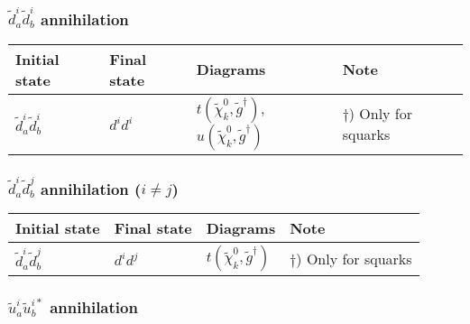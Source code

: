 \subsubsection{$\tilde{d}^i_{a}\tilde{d}_{b}^{i}$ annihilation}

\begin{center}
\begin{tabular}{llll} \hline
{\bfseries Initial state} & {\bfseries Final state} &
{\bfseries Diagrams} & {\bfseries Note} \\ \hline \tabspace
$\tilde{d}^i_a\tilde{d}^{i}_b$ & $d^i d^i$ &
$t(\tilde{\chi}_{k}^0,\tilde{g}^\dagger)$, $u(\tilde{\chi}_{k}^0,\tilde{g}^\dagger)$ 
& $\dagger$) Only for squarks \\ \hline
\end{tabular}
\end{center}

\subsubsection{$\tilde{d}^i_{a}\tilde{d}_{b}^{j}$ annihilation ($i \ne j$)}

\begin{center}
\begin{tabular}{llll} \hline
{\bfseries Initial state} & {\bfseries Final state} &
{\bfseries Diagrams} & {\bfseries Note} \\ \hline \tabspace
$\tilde{d}^i_a\tilde{d}^{j}_b$ & $d^i d^j$ &
$t(\tilde{\chi}_{k}^0,\tilde{g}^\dagger)$
& $\dagger$) Only for squarks \\ \hline
\end{tabular}
\end{center}

\subsubsection{$\tilde{u}^i_{a}\tilde{u}_{b}^{i*}$ annihilation}

